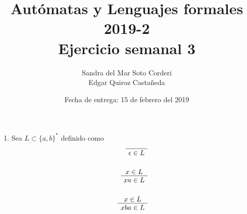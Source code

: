 \documentclass{article}
\begin{document}
    \title{Autómatas y Lenguajes formales \\
    \large 2019-2 \\
    \large Ejercicio semanal 3}

    \date{Fecha de entrega: 15 de febrero del 2019}

    \author{Sandra del Mar Soto Corderi \\
            Edgar Quiroz Castañeda}  
    \maketitle
    
    \begin{enumerate}
        \item {
            Sea $L \subset \{a, b\}^*$ definido como 
            \begin{align*}
                \AxiomC{}
                \UnaryInfC{$\epsilon \in L$}
                \DisplayProof \\
                \\
                \AxiomC{$x \in L $}
                \UnaryInfC{$xa \in L$}
                \DisplayProof \\
                \\
                \AxiomC{$x \in L $}
                \UnaryInfC{$xba \in L$}
                \DisplayProof \\
            \end{align*}

}
\end{enumerate}
\end{document}
